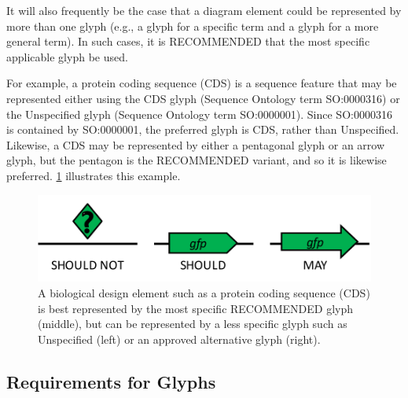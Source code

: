 It will also frequently be the case that a diagram element could be represented by more than one glyph (e.g., a glyph for a specific term and a glyph for a more general term).
In such cases, it is RECOMMENDED that the most specific applicable glyph be used.

For example, a protein coding sequence (CDS) is a sequence feature that may be represented either using the CDS glyph (Sequence Ontology term SO:0000316) or the Unspecified glyph (Sequence Ontology term SO:0000001).  
Since SO:0000316 is contained by SO:0000001, the preferred glyph is CDS, rather than Unspecified.
Likewise, a CDS may be represented by either a pentagonal glyph or an arrow glyph, but the pentagon is the RECOMMENDED variant, and so it is likewise preferred.  
\ref{f:glyphalternatives} illustrates this example.

\begin{figure}[h!]
\centering
\includegraphics[scale=0.6]{figures/glyphalternatives.pdf}
\caption{A biological design element such as a protein coding sequence (CDS) is best represented by the most specific RECOMMENDED glyph (middle), but can be represented by a less specific glyph such as Unspecified (left) or an approved alternative glyph (right).}
\label{f:glyphalternatives}
\end{figure}

\subsection{Requirements for Glyphs}

